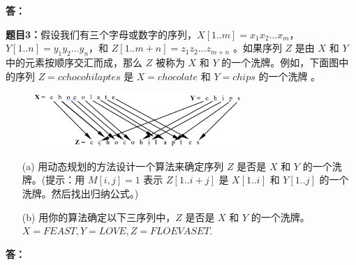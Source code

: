 \documentclass[12pt,a4paper]{article}
\begin{document}
\begin{CJK*}{UTF8}{gbsn}
	\vspace{5pt}
	\noindent
	{\bf 答：}


	\vspace{10pt}
	\noindent
	{\bf 题目3：}假设我们有三个字母或数字的序列，$X[1..m]  = x_1x_2 ... x_m$， $Y[1..n]  = y_1y_2...y_n$，和 $Z[1..m+n] = z_1z_2...z_{m+n}$ 。如果序列 $Z$ 是由 $X$ 和 $Y$ 中的元素按顺序交汇而成，那么 $Z$  被称为 $X$ 和 $Y$ 的一个洗牌。例如，下面图中的序列 $Z = cchocohilaptes$ 是 $X = chocolate$ 和 $Y = chips$ 的一个洗牌 。
	\begin{figure}[h]
		\centering %
		\includegraphics[width=0.7\textwidth]{3} %
	\end{figure}
	\begin{enumerate}
		\item[(a)]  用动态规划的方法设计一个算法来确定序列 $Z$ 是否是 $X$ 和 $Y$ 的一个洗牌。(提示：用 $M[i, j] = 1$ 表示 $Z[1..i+j]$ 是 $X[1..i]$ 和 $Y[1..j]$ 的一个洗牌。然后找出归纳公式。)
		\item[(b)]  用你的算法确定以下三序列中，$Z$ 是否是 $X$ 和 $Y$ 的一个洗牌。\\
			$X = FEAST, 	Y = LOVE, 	Z =  FLOEVASET$.
	\end{enumerate}
	\vspace{5pt}
	\noindent
	{\bf 答：}

\end{CJK*}
\end{document}
